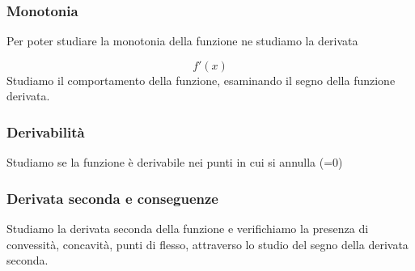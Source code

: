 \documentclass[../analisi.tex]{subfiles}
\begin{document}
\subsubsection{Monotonia}
Per poter studiare la monotonia della funzione ne studiamo la derivata

\begin{equation}
	f' ( x ) 
\end{equation}
Studiamo il comportamento della funzione, esaminando il segno della funzione
derivata.


\subsubsection{Derivabilità}
Studiamo se la funzione è derivabile nei punti in cui si annulla (=0)


\subsubsection{Derivata seconda e conseguenze}
Studiamo la derivata seconda della funzione e verifichiamo la presenza
di convessità, concavità, punti di flesso, attraverso lo 
studio del segno della derivata seconda.
\end{document}
